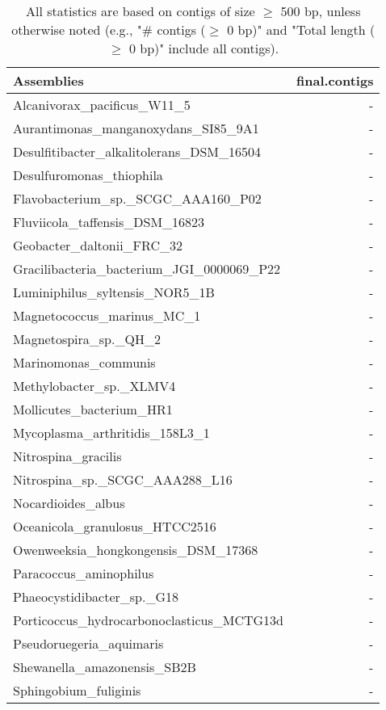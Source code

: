 \documentclass[12pt,a4paper]{article}
\begin{document}
\begin{table}[ht]
\begin{center}
\caption{All statistics are based on contigs of size $\geq$ 500 bp, unless otherwise noted (e.g., "\# contigs ($\geq$ 0 bp)" and "Total length ($\geq$ 0 bp)" include all contigs).}
\begin{tabular}{|l*{1}{|r}|}
\hline
Assemblies & final.contigs \\ \hline
Alcanivorax\_pacificus\_W11\_5 & - \\ \hline
Aurantimonas\_manganoxydans\_SI85\_9A1 & - \\ \hline
Desulfitibacter\_alkalitolerans\_DSM\_16504 & - \\ \hline
Desulfuromonas\_thiophila & - \\ \hline
Flavobacterium\_sp.\_SCGC\_AAA160\_P02 & - \\ \hline
Fluviicola\_taffensis\_DSM\_16823 & - \\ \hline
Geobacter\_daltonii\_FRC\_32 & - \\ \hline
Gracilibacteria\_bacterium\_JGI\_0000069\_P22 & - \\ \hline
Luminiphilus\_syltensis\_NOR5\_1B & - \\ \hline
Magnetococcus\_marinus\_MC\_1 & - \\ \hline
Magnetospira\_sp.\_QH\_2 & - \\ \hline
Marinomonas\_communis & - \\ \hline
Methylobacter\_sp.\_XLMV4 & - \\ \hline
Mollicutes\_bacterium\_HR1 & - \\ \hline
Mycoplasma\_arthritidis\_158L3\_1 & - \\ \hline
Nitrospina\_gracilis & - \\ \hline
Nitrospina\_sp.\_SCGC\_AAA288\_L16 & - \\ \hline
Nocardioides\_albus & - \\ \hline
Oceanicola\_granulosus\_HTCC2516 & - \\ \hline
Owenweeksia\_hongkongensis\_DSM\_17368 & - \\ \hline
Paracoccus\_aminophilus & - \\ \hline
Phaeocystidibacter\_sp.\_G18 & - \\ \hline
Porticoccus\_hydrocarbonoclasticus\_MCTG13d & - \\ \hline
Pseudoruegeria\_aquimaris & - \\ \hline
Shewanella\_amazonensis\_SB2B & - \\ \hline
Sphingobium\_fuliginis & - \\ \hline

\end{tabular}
\end{center}
\end{table}
\end{document}

